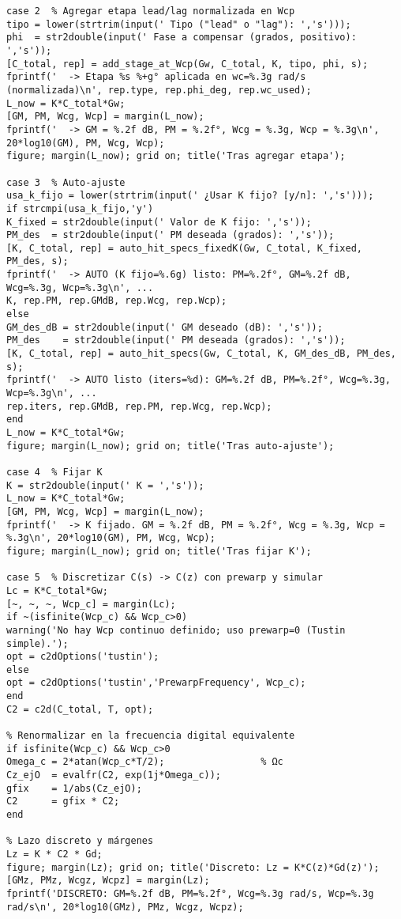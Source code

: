 \begin{lstlisting}[style=matlabstyle,caption={Hoja cálculos utilizada para el diseño de los compensadores.},label={matlab:hojaDeCalculos}]
case 2  % Agregar etapa lead/lag normalizada en Wcp
tipo = lower(strtrim(input(' Tipo ("lead" o "lag"): ','s')));
phi  = str2double(input(' Fase a compensar (grados, positivo): ','s'));
[C_total, rep] = add_stage_at_Wcp(Gw, C_total, K, tipo, phi, s);
fprintf('  -> Etapa %s %+g° aplicada en wc=%.3g rad/s (normalizada)\n', rep.type, rep.phi_deg, rep.wc_used);
L_now = K*C_total*Gw;
[GM, PM, Wcg, Wcp] = margin(L_now);
fprintf('  -> GM = %.2f dB, PM = %.2f°, Wcg = %.3g, Wcp = %.3g\n', 20*log10(GM), PM, Wcg, Wcp);
figure; margin(L_now); grid on; title('Tras agregar etapa');

case 3  % Auto-ajuste
usa_k_fijo = lower(strtrim(input(' ¿Usar K fijo? [y/n]: ','s')));
if strcmpi(usa_k_fijo,'y')
K_fixed = str2double(input(' Valor de K fijo: ','s'));
PM_des  = str2double(input(' PM deseada (grados): ','s'));
[K, C_total, rep] = auto_hit_specs_fixedK(Gw, C_total, K_fixed, PM_des, s);
fprintf('  -> AUTO (K fijo=%.6g) listo: PM=%.2f°, GM=%.2f dB, Wcg=%.3g, Wcp=%.3g\n', ...
K, rep.PM, rep.GMdB, rep.Wcg, rep.Wcp);
else
GM_des_dB = str2double(input(' GM deseado (dB): ','s'));
PM_des    = str2double(input(' PM deseada (grados): ','s'));
[K, C_total, rep] = auto_hit_specs(Gw, C_total, K, GM_des_dB, PM_des, s);
fprintf('  -> AUTO listo (iters=%d): GM=%.2f dB, PM=%.2f°, Wcg=%.3g, Wcp=%.3g\n', ...
rep.iters, rep.GMdB, rep.PM, rep.Wcg, rep.Wcp);
end
L_now = K*C_total*Gw;
figure; margin(L_now); grid on; title('Tras auto-ajuste');

case 4  % Fijar K
K = str2double(input(' K = ','s'));
L_now = K*C_total*Gw;
[GM, PM, Wcg, Wcp] = margin(L_now);
fprintf('  -> K fijado. GM = %.2f dB, PM = %.2f°, Wcg = %.3g, Wcp = %.3g\n', 20*log10(GM), PM, Wcg, Wcp);
figure; margin(L_now); grid on; title('Tras fijar K');

case 5  % Discretizar C(s) -> C(z) con prewarp y simular
Lc = K*C_total*Gw;
[~, ~, ~, Wcp_c] = margin(Lc);
if ~(isfinite(Wcp_c) && Wcp_c>0)
warning('No hay Wcp continuo definido; uso prewarp=0 (Tustin simple).');
opt = c2dOptions('tustin');
else
opt = c2dOptions('tustin','PrewarpFrequency', Wcp_c);
end
C2 = c2d(C_total, T, opt);

% Renormalizar en la frecuencia digital equivalente
if isfinite(Wcp_c) && Wcp_c>0
Omega_c = 2*atan(Wcp_c*T/2);                 % Ωc
Cz_ejO  = evalfr(C2, exp(1j*Omega_c));
gfix    = 1/abs(Cz_ejO);
C2      = gfix * C2;
end

% Lazo discreto y márgenes
Lz = K * C2 * Gd;
figure; margin(Lz); grid on; title('Discreto: Lz = K*C(z)*Gd(z)');
[GMz, PMz, Wcgz, Wcpz] = margin(Lz);
fprintf('DISCRETO: GM=%.2f dB, PM=%.2f°, Wcg=%.3g rad/s, Wcp=%.3g rad/s\n', 20*log10(GMz), PMz, Wcgz, Wcpz);


\end{lstlisting}
